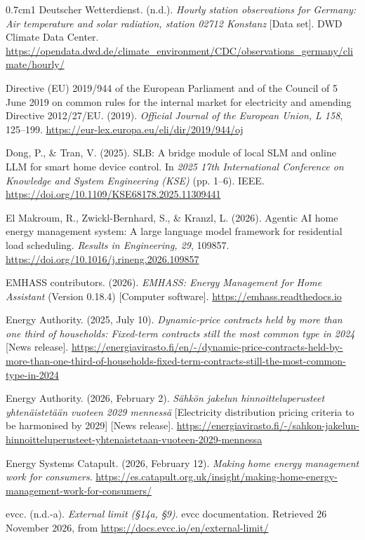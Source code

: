 \documentclass[12pt,a4paper]{report}
\begin{document}
\begin{hangparas}{0.7cm}{1}
Deutscher Wetterdienst. (n.d.). \textit{Hourly station observations
for Germany: Air temperature and solar radiation, station 02712
Konstanz} [Data set]. DWD Climate Data Center.
\url{https://opendata.dwd.de/climate_environment/CDC/observations_germany/climate/hourly/}

Directive (EU) 2019/944 of the European Parliament and of the Council
of 5 June 2019 on common rules for the internal market for electricity
and amending Directive 2012/27/EU. (2019). \textit{Official Journal of
the European Union, L 158}, 125--199.
\url{https://eur-lex.europa.eu/eli/dir/2019/944/oj}

Dong, P., \& Tran, V. (2025). SLB: A bridge module of local SLM and
online LLM for smart home device control. In \textit{2025 17th
International Conference on Knowledge and System Engineering (KSE)}
(pp. 1--6). IEEE. \url{https://doi.org/10.1109/KSE68178.2025.11309441}

El Makroum, R., Zwickl-Bernhard, S., \& Kranzl, L. (2026). Agentic AI
home energy management system: A large language model framework for
residential load scheduling. \textit{Results in Engineering, 29},
109857. \url{https://doi.org/10.1016/j.rineng.2026.109857}

EMHASS contributors. (2026). \textit{EMHASS: Energy Management for Home
Assistant} (Version 0.18.4) [Computer software].
\url{https://emhass.readthedocs.io}

Energy Authority. (2025, July 10). \textit{Dynamic-price contracts held
by more than one third of households: Fixed-term contracts still the
most common type in 2024} [News release].
\url{https://energiavirasto.fi/en/-/dynamic-price-contracts-held-by-more-than-one-third-of-households-fixed-term-contracts-still-the-most-common-type-in-2024}

Energy Authority. (2026, February 2). \textit{Sähkön jakelun
hinnoitteluperusteet yhtenäistetään vuoteen 2029 mennessä} [Electricity
distribution pricing criteria to be harmonised by 2029] [News release].
\url{https://energiavirasto.fi/-/sahkon-jakelun-hinnoitteluperusteet-yhtenaistetaan-vuoteen-2029-mennessa}

Energy Systems Catapult. (2026, February 12). \textit{Making home
energy management work for consumers}.
\url{https://es.catapult.org.uk/insight/making-home-energy-management-work-for-consumers/}

evcc. (n.d.-a). \textit{External limit (§14a, §9)}. evcc documentation.
Retrieved 26 November 2026, from
\url{https://docs.evcc.io/en/external-limit/}


\end{hangparas}
\end{document}
